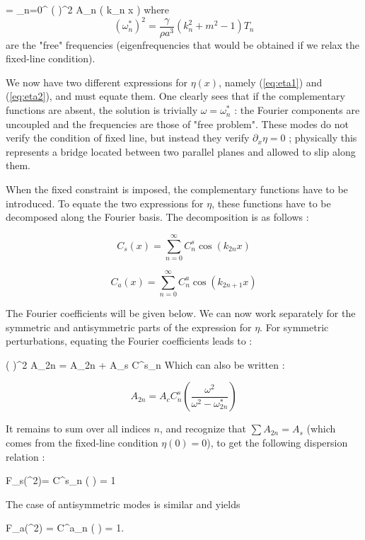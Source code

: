 \be 
\eta = \sum\limits_{n=0}^{\infty} \left( \right)^2 A_n \cos (  k_n x )
\label{eq:eta2}
\ee
where
$$
(\omega^*_{n})^2   = \frac{\gamma}{\rho a^3} \left( k_n^2 + m^2 - 1 \right) T_n
$$
are the "free" frequencies (eigenfrequencies that would be obtained if we relax the fixed-line condition).




We now have two different expressions for $\eta(x)$, namely (\ref{eq:eta1}) and (\ref{eq:eta2}), and must equate them. One clearly sees that if the complementary functions are absent, the solution is trivially
$\omega = \omega^*_{n}$ : the Fourier components are uncoupled and the frequencies are those of "free problem". These modes do not verify the condition of fixed line, but instead they verify $\partial_x \eta =0 $ ; physically this represents a bridge located between two parallel planes and allowed to slip along them.

When the fixed constraint is imposed, the complementary functions have to be introduced. To equate the two expressions for $\eta$, these functions have to be decomposed along the Fourier basis. The decomposition is as follows :


$$
C_s(x) = \sum\limits_{n=0}^{\infty} C^s_{n} \cos (  k_{2n} x ) 
$$

$$
C_a(x) = \sum\limits_{n=0}^{\infty} C^a_{n} \cos (  k_{2n+1} x )
$$

The Fourier coefficients will be given below.
We can now work separately for the symmetric and antisymmetric parts of the expression for $\eta$.
For symmetric perturbations, equating the Fourier coefficients leads to :

\be 
\left( \right)^2 A_{2n} = A_{2n} + A_s C^s_n %
\label{eq:AnAs}
\ee
Which can also be written :


$$
A_{2n}  = A_c C^s_{n} \left( \frac{\omega^2}{\omega^2- \omega^*_{2n}} \right) 
$$

It remains to sum over all indices $n$, and recognize that $\sum A_{2n} = A_s$
(which comes from the fixed-line condition $\eta(0) = 0$), to get the following dispersion relation :



\be
F_s(\omega^2)=  \sum C^s_{n} \left(  \right)  = 1
\label{eq:RDs}
\ee

The case of antisymmetric modes is similar and yields 

\be
F_a(\omega^2) = \sum C^a_{n} \left(  \right)  = 1.
\label{eq:RDa}
\ee


